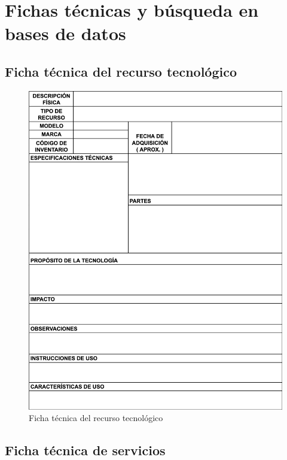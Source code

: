\appendix

\chapter{Fichas técnicas y búsqueda en bases de datos}\label{apendice:fichas-y-busquedas}

\section{Ficha técnica del recurso tecnológico}
\begin{figure}[H]
    \centering
    \includegraphics[width=\textwidth,height=0.85\textheight,keepaspectratio]{apendices/caracterizacionInfraestructura.png}
    \caption{Ficha técnica del recurso tecnológico}\label{fig:tabla-ficha-tecnica}
\end{figure}
\FloatBarrier\section*{Ficha técnica de servicios}

